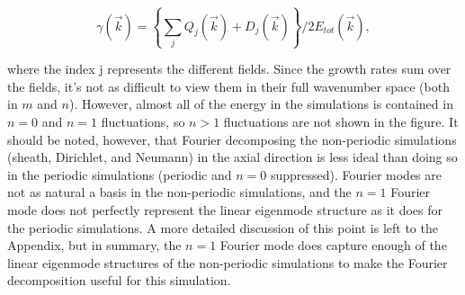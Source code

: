 \documentclass[showpacs,preprintnumbers,amsmath,amssymb,superscriptaddress,aip]{revtex4-1}
\def\beq{\begin{equation}}
\def\eeq{\end{equation}}
\begin{document}
\beq
\label{gamma_def}
\gamma(\vec{k}) = \left\{ \sum_j Q_j(\vec{k}) + D_j(\vec{k}) \right\} /2 E_{tot}(\vec{k}), 
\eeq

where the index j represents the different fields.
Since the growth rates sum over the fields, it's not as difficult to view them in their full wavenumber space (both in $m$ and $n$). However, almost all of the energy in the simulations is 
contained in $n=0$ and $n=1$ fluctuations, so $n>1$ fluctuations are not shown in the figure. It should be noted, however, that Fourier decomposing the non-periodic simulations (sheath, Dirichlet, and Neumann)
in the axial direction is less ideal than doing so in the periodic simulations (periodic and $n=0$ suppressed). 
Fourier modes are not as natural a basis in the non-periodic simulations, and the $n=1$ Fourier mode does not perfectly represent the linear
eigenmode structure as it does for the periodic simulations. 
A more detailed discussion of this point is left to the Appendix, but in summary, the $n=1$ Fourier mode does capture enough of the
linear eigenmode structures of the non-periodic simulations to make the Fourier decomposition useful for this simulation.
\end{document}
